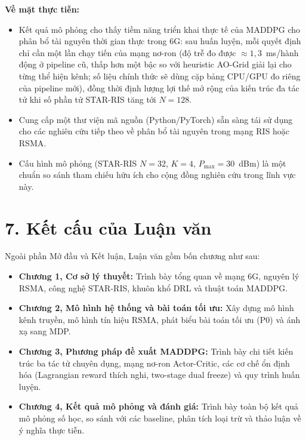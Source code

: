 \noindent\textbf{Về mặt thực tiễn:}
\begin{itemize}[leftmargin=*]
\item Kết quả mô phỏng cho thấy tiềm năng triển khai thực tế của MADDPG
cho phân bổ tài nguyên thời gian thực trong 6G: sau huấn luyện, mỗi
quyết định chỉ cần một lần chạy tiến của mạng nơ-ron (độ trễ đo được
$\approx 1{,}3$~ms/hành động ở pipeline cũ, thấp hơn một bậc so với
heuristic AO-Grid giải lại cho từng thể hiện kênh; số liệu chính thức
sẽ dùng cặp bảng CPU/GPU đo riêng của pipeline mới), đồng thời định
lượng lợi thế mở rộng của kiến trúc đa tác tử khi số phần tử STAR-RIS
tăng tới $N=128$.
\item Cung cấp một thư viện mã nguồn (Python/PyTorch) sẵn sàng tái sử dụng
cho các nghiên cứu tiếp theo về phân bổ tài nguyên trong mạng RIS hoặc
RSMA.
\item Cấu hình mô phỏng (STAR-RIS $N=32$, $K=4$, $P_{\max}=30$~dBm) là một
chuẩn so sánh tham chiếu hữu ích cho cộng đồng nghiên cứu trong lĩnh
vực này.
\end{itemize}

\section*{7. Kết cấu của Luận văn}

Ngoài phần Mở đầu và Kết luận, Luận văn gồm bốn chương như sau:
\begin{itemize}[leftmargin=*]
\item \textbf{Chương 1, Cơ sở lý thuyết:} Trình bày tổng quan về mạng 6G,
nguyên lý RSMA, công nghệ STAR-RIS, khuôn khổ DRL và thuật toán MADDPG.
\item \textbf{Chương 2, Mô hình hệ thống và bài toán tối ưu:} Xây dựng
mô hình kênh truyền, mô hình tín hiệu RSMA, phát biểu bài toán tối ưu
(P0) và ánh xạ sang MDP.
\item \textbf{Chương 3, Phương pháp đề xuất MADDPG:} Trình bày chi tiết
kiến trúc ba tác tử chuyên dụng, mạng nơ-ron Actor-Critic, các cơ chế ổn định hóa (Lagrangian reward thích nghi, two-stage dual freeze) và quy trình huấn
luyện.
\item \textbf{Chương 4, Kết quả mô phỏng và đánh giá:} Trình bày toàn bộ
kết quả mô phỏng số học, so sánh với các baseline, phân tích loại trừ
và thảo luận về ý nghĩa thực tiễn.
\end{itemize}
